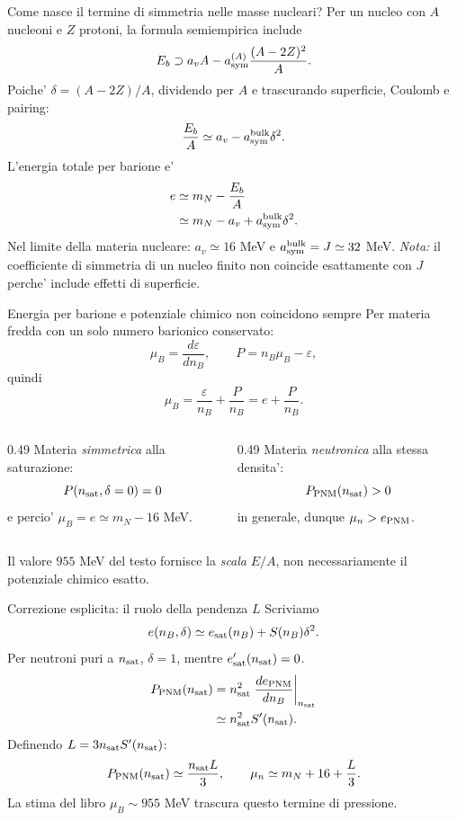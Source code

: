 \begin{frame}{Come nasce il termine di simmetria nelle masse nucleari?}
\small
Per un nucleo con $A$ nucleoni e $Z$ protoni, la formula semiempirica include
\[
E_b\supset a_vA-a_{\rm sym}^{(A)}\frac{(A-2Z)^2}{A}.
\]
Poiche' $\delta=(A-2Z)/A$, dividendo per $A$ e trascurando superficie, Coulomb e pairing:
\[
\frac{E_b}{A}\simeq a_v-a_{\rm sym}^{\rm bulk}\delta^2.
\]
L'energia totale per barione e'
\[
\begin{aligned}
e&\simeq m_N-\frac{E_b}{A}\\
&\simeq m_N-a_v+a_{\rm sym}^{\rm bulk}\delta^2.
\end{aligned}
\]
Nel limite della materia nucleare: $a_v\simeq16$ MeV e $a_{\rm sym}^{\rm bulk}=J\simeq32$ MeV.
\medskip
\textit{Nota:} il coefficiente di simmetria di un nucleo finito non coincide esattamente con $J$ perche' include effetti di superficie.
\end{frame}

\begin{frame}{Energia per barione e potenziale chimico non coincidono sempre}
\small
Per materia fredda con un solo numero barionico conservato:
\[
\mu_B=\frac{d\varepsilon}{dn_B},\qquad P=n_B\mu_B-\varepsilon,
\]
quindi
\[
{\mu_B=\frac{\varepsilon}{n_B}+\frac{P}{n_B}=e+\frac{P}{n_B}.}
\]
\begin{columns}[T,onlytextwidth]
\begin{column}{0.49\textwidth}
Materia \emph{simmetrica} alla saturazione:
\[
P(n_{\rm sat},\delta=0)=0
\]
e percio' $\mu_B=e\simeq m_N-16$ MeV.
\end{column}
\begin{column}{0.49\textwidth}
Materia \emph{neutronica} alla stessa densita':
\[
P_{\rm PNM}(n_{\rm sat})>0
\]
in generale, dunque $\mu_n>e_{\rm PNM}$.
\end{column}
\end{columns}
\medskip
Il valore $955$ MeV del testo fornisce la \emph{scala} $E/A$, non necessariamente il potenziale chimico esatto.
\end{frame}

\begin{frame}{Correzione esplicita: il ruolo della pendenza $L$}
\small
Scriviamo
\[
e(n_B,\delta)\simeq e_{\rm sat}(n_B)+S(n_B)\delta^2.
\]
Per neutroni puri a $n_{\rm sat}$, $\delta=1$, mentre $e_{\rm sat}'(n_{\rm sat})=0$.
\[
\begin{aligned}
P_{\rm PNM}(n_{\rm sat})
&=n_{\rm sat}^2\left.\frac{d e_{\rm PNM}}{dn_B}\right|_{n_{\rm sat}}\\
&\simeq n_{\rm sat}^2 S'(n_{\rm sat}).
\end{aligned}
\]
Definendo $L=3n_{\rm sat}S'(n_{\rm sat})$:
\[
P_{\rm PNM}(n_{\rm sat})\simeq\frac{n_{\rm sat}L}{3},
\qquad
{\mu_n\simeq m_N+16+\frac L3.}
\]
La stima del libro $\mu_B\sim955$ MeV trascura questo termine di pressione.
\end{frame}

